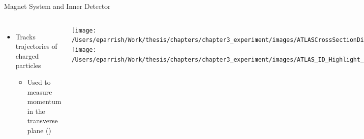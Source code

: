 \documentclass[aspectratio=169,xcolor=table]{beamer}
\begin{document}
\begin{frame}[t]{Magnet System and Inner Detector}
\begin{columns}[t]
        \begin{itemize}
          \item Tracks trajectories of charged particles
          \begin{itemize}
              \vspace{-.4cm}
              \item Used to measure momentum in the transverse plane (\pt)
          \end{itemize}
        \end{itemize}
        \begin{columns}
        \texttt{[image: /Users/eparrish/Work/thesis/chapters/chapter3\_experiment/images/ATLASCrossSectionDiagram.png]}
              \texttt{[image: /Users/eparrish/Work/thesis/chapters/chapter3\_experiment/images/ATLAS\_ID\_Highlight\_Run2]}
        \end{columns}
        \centering

          \texttt{[image: /Users/eparrish/Work/thesis/chapters/chapter3\_experiment/images/ATLAS\_ID\_Run2]}
      \end{columns}
    \end{frame}
\end{document}
